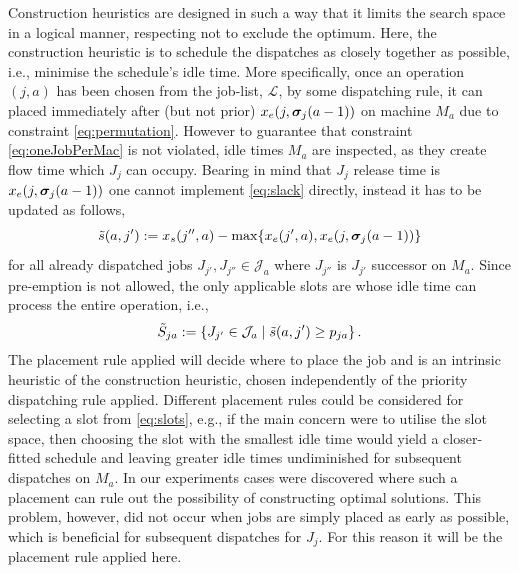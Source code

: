 \documentclass[smallextended]{svjour3}
\begin{document}
Construction heuristics are designed in such a way that it limits the search 
space in a logical manner, respecting not to exclude the 
optimum. Here, the 
construction heuristic is to schedule the dispatches as closely together as 
possible, i.e., minimise the schedule's idle time. 
More specifically, once an operation $(j,a)$ has been chosen from the job-list, 
$\mathcal{L}$, by some dispatching rule, it can placed immediately after (but 
not prior) $x_e(j,\bm \sigma_j(a-1))$ on machine $M_a$ due to constraint 
\cref{eq:permutation}. 
However to guarantee that constraint \cref{eq:oneJobPerMac} is not violated, 
idle times $M_a$ are inspected, as they create flow time  which $J_j$ can 
occupy. Bearing in mind that $J_j$ release time is $x_e(j,\bm \sigma_j(a-1))$ one 
cannot implement \cref{eq:slack} directly, instead it has to be updated as 
follows,
\begin{equation}
\tilde{s}(a,j'):= x_s(j'',a)-\max\{x_e(j',a),x_e(j,\vsigma_j(a-1))\} %
\end{equation}
for all already dispatched jobs $J_{j'},J_{j''}\in \mathcal{J}_a$ where 
$J_{j''}$ is $J_{j'}$ successor on $M_a$. Since pre-emption is not allowed, the 
only applicable slots are whose idle time can process the entire operation, 
i.e.,
\begin{equation}
\tilde{S}_{ja} := \left\{J_{j'}\in \mathcal{J}_a\;\middle|\;\tilde{s}(a,j')\geq p_{ja} 
\right\}\label{eq:slots}.
\end{equation} 
The placement rule applied will decide where to place the job and 
is an intrinsic heuristic of the construction heuristic, chosen independently 
of the priority dispatching rule applied. 
Different placement rules could be considered for selecting a slot from 
\cref{eq:slots}, e.g., if the main concern were to utilise the slot space, then 
choosing the slot with the smallest idle time would yield a closer-fitted 
schedule and leaving greater idle times undiminished for subsequent dispatches 
on $M_a$.
In our experiments cases were discovered where such a placement can rule out 
the possibility of constructing optimal solutions.
This problem, however, did not occur when jobs are simply placed as early as 
possible, which is beneficial for subsequent dispatches for $J_j$. 
For this reason it will be the placement rule applied here.
\end{document}
